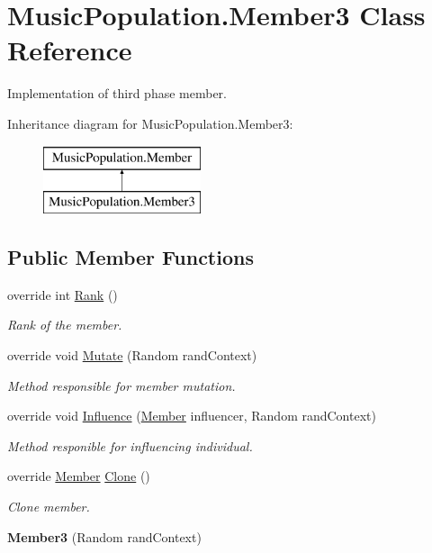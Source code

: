 \hypertarget{class_music_population_1_1_member3}{\section{Music\+Population.\+Member3 Class Reference}
\label{class_music_population_1_1_member3}
}


Implementation of third phase member.  


Inheritance diagram for Music\+Population.\+Member3\+:\begin{figure}[H]
\begin{center}
\leavevmode
\includegraphics[height=2.000000cm]{class_music_population_1_1_member3}
\end{center}
\end{figure}
\subsection*{Public Member Functions}
\begin{DoxyCompactItemize}
\item 
override int \hyperlink{class_music_population_1_1_member3_a3148bb13399637bb2cf2addf6d8ecbec}{Rank} ()
\begin{DoxyCompactList}\small\item\em Rank of the member. \end{DoxyCompactList}\item 
override void \hyperlink{class_music_population_1_1_member3_a443d06792b6e3566308a67d56e31c2d8}{Mutate} (Random rand\+Context)
\begin{DoxyCompactList}\small\item\em Method responsible for member mutation. \end{DoxyCompactList}\item 
override void \hyperlink{class_music_population_1_1_member3_aabde212fac4cd75573a3ed07b6522e1d}{Influence} (\hyperlink{class_music_population_1_1_member}{Member} influencer, Random rand\+Context)
\begin{DoxyCompactList}\small\item\em Method responible for influencing individual. \end{DoxyCompactList}\item 
override \hyperlink{class_music_population_1_1_member}{Member} \hyperlink{class_music_population_1_1_member3_ae37f77498a7c3ccec6b8531746eff1ec}{Clone} ()
\begin{DoxyCompactList}\small\item\em Clone member. \end{DoxyCompactList}\item 
\hypertarget{class_music_population_1_1_member3_a64e08c71b9df2f480a2f71325bb45058}{{\bfseries Member3} (Random rand\+Context)}\label{class_music_population_1_1_member3_a64e08c71b9df2f480a2f71325bb45058}

\end{DoxyCompactItemize}
